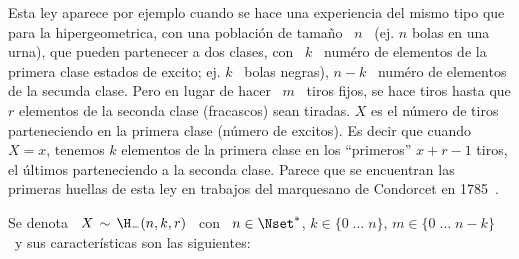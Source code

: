 \label{Sssec:MP:HipergeometricaNegativa}

Esta ley aparece  por ejemplo cuando se hace una experiencia  del mismo tipo que
para la hipergeometrica, con una poblaci\'on de tama\~no \ $n$ \ (ej.  $n$ bolas
en  una urna),  que pueden  partenecer a  dos clases,  con \  $k$ \  num\'ero de
elementos de la primera clase estados  de excito; ej. $k$ \ bolas negras), $n-k$
\ num\'ero  de elementos de la  secunda clase.  Pero en  lugar de hacer  \ $m$ \
tiros  fijos,  se  hace tiros  hasta  que  $r$  elementos  de la  seconda  clase
(fracascos)  sean tiradas.   $X$ es  el n\'umero  de tiros  parteneciendo  en la
primera clase  (n\'umero de excitos). Es decir  que cuando $X =  x$, tenemos $k$
elementos de  la primera clase en  los ``primeros'' $x+r-1$  tiros, el \'ultimos
parteneciendo a la seconda clase.  Parece que se encuentran las primeras huellas
de esta ley en trabajos del marquesano de Condorcet en 1785~\cite{Con85}.

Se denota \ $X \,  \sim \, \H_-(n,k,r)$ \ con \ $n \in \Nset^*$,  \quad $k \in \{ 0 \;
\ldots \; n \}$, \quad $m \in \{  0 \; \ldots \; n-k \}$ \ y sus caracter\'isticas
son las siguientes:

